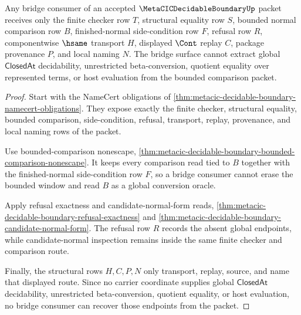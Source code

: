 \begin{theorem}
\label{thm:metacic-decidable-boundary-bridge-status}
Any bridge consumer of an accepted $\MetaCICDecidableBoundaryUp$ packet receives only the finite checker row $T$, structural equality row $S$, bounded normal comparison row $B$, finished-normal side-condition row $F$, refusal row $R$, componentwise $\hsame$ transport $H$, displayed $\Cont$ replay $C$, package provenance $P$, and local naming $N$. The bridge surface cannot extract global $\mathsf{ClosedAt}$ decidability, unrestricted beta-conversion, quotient equality over represented terms, or host evaluation from the bounded comparison packet.
\end{theorem}
\begin{proof}
Start with the NameCert obligations of \autoref{thm:metacic-decidable-boundary-namecert-obligations}. They expose exactly the finite checker, structural equality, bounded comparison, side-condition, refusal, transport, replay, provenance, and local naming rows of the packet.

Use bounded-comparison nonescape, \autoref{thm:metacic-decidable-boundary-bounded-comparison-nonescape}. It keeps every comparison read tied to $B$ together with the finished-normal side-condition row $F$, so a bridge consumer cannot erase the bounded window and read $B$ as a global conversion oracle.

Apply refusal exactness and candidate-normal-form reads, \autoref{thm:metacic-decidable-boundary-refusal-exactness} and \autoref{thm:metacic-decidable-boundary-candidate-normal-form}. The refusal row $R$ records the absent global endpoints, while candidate-normal inspection remains inside the same finite checker and comparison route.

Finally, the structural rows $H,C,P,N$ only transport, replay, source, and name that displayed route. Since no carrier coordinate supplies global $\mathsf{ClosedAt}$ decidability, unrestricted beta-conversion, quotient equality, or host evaluation, no bridge consumer can recover those endpoints from the packet.
\end{proof}

